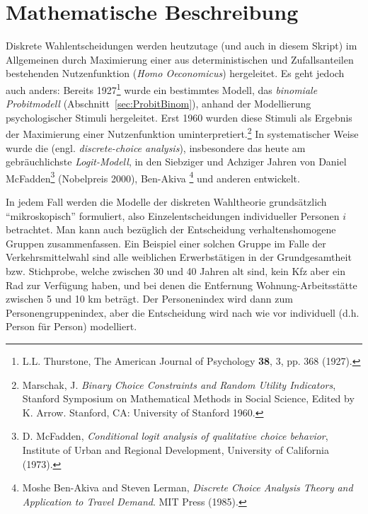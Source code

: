 \section{\label{sec:discrMath}Mathematische Beschreibung}
Diskrete Wahlentscheidungen werden heutzutage 
(und auch in diesem Skript) im Allgemeinen durch Maximierung  einer
aus deterministischen und Zufallsanteilen bestehenden Nutzenfunktion
(\emph{Homo Oeconomicus}) hergeleitet. Es geht jedoch auch anders:
Bereits 
1927\footnote{ L.L. Thurstone, The American Journal of Psychology
  \textbf{38}, 3, pp. 368 (1927).} wurde 
ein bestimmtes Modell, das \emph{binomiale Probitmodell}
(Abschnitt~\ref{sec:ProbitBinom}), anhand der Modellierung 
psychologischer Stimuli hergeleitet. Erst 1960
 wurden diese Stimuli
als Ergebnis der Maximierung einer Nutzenfunktion
uminterpretiert.\footnote{Marschak, J. \textit{Binary Choice Constraints and
  Random Utility Indicators},  Stanford 
Symposium on Mathematical Methods in Social Science, Edited by K. Arrow.
Stanford, CA: University of Stanford 1960.} 
In systematischer Weise
wurde die  (engl. \textit{discrete-choice analysis}), insbesondere
das heute am gebr\"auchlichste \emph{Logit-Modell}, 
in den Siebziger und Achziger 
Jahren von Daniel
McFadden\footnote{D. McFadden, \textit{Conditional logit analysis of
  qualitative choice behavior}, Institute of Urban and Regional
  Development, University of California (1973).} (Nobelpreis 2000),
 Ben-Akiva
\footnote{Moshe Ben-Akiva and Steven Lerman, \textit{Discrete Choice Analysis
Theory and Application to Travel Demand}. MIT Press (1985).} 
und anderen entwickelt. 

In jedem Fall werden die
 Modelle der diskreten Wahltheorie grunds\"atzlich
``mikroskopisch'' formuliert, also Einzelentscheidungen individueller
Personen $i$ betrachtet. Man kann auch bez\"uglich der Entscheidung
verhaltenshomogene  Gruppen zusammenfassen. Ein Beispiel einer solchen
Gruppe im Falle der Verkehrsmittelwahl sind alle weiblichen
Erwerbst\"atigen in der Grundgesamtheit bzw. Stichprobe, welche 
zwischen 30 und 40 Jahren alt sind, kein Kfz aber ein Rad zur
Verf\"ugung haben,
und bei denen die Entfernung Wohnung-Arbeitsst\"atte zwischen 5 und 10
km betr\"agt. Der Personenindex wird dann zum Personengruppenindex,
aber die Entscheidung wird nach wie vor individuell (d.h. Person f\"ur
Person) modelliert.

